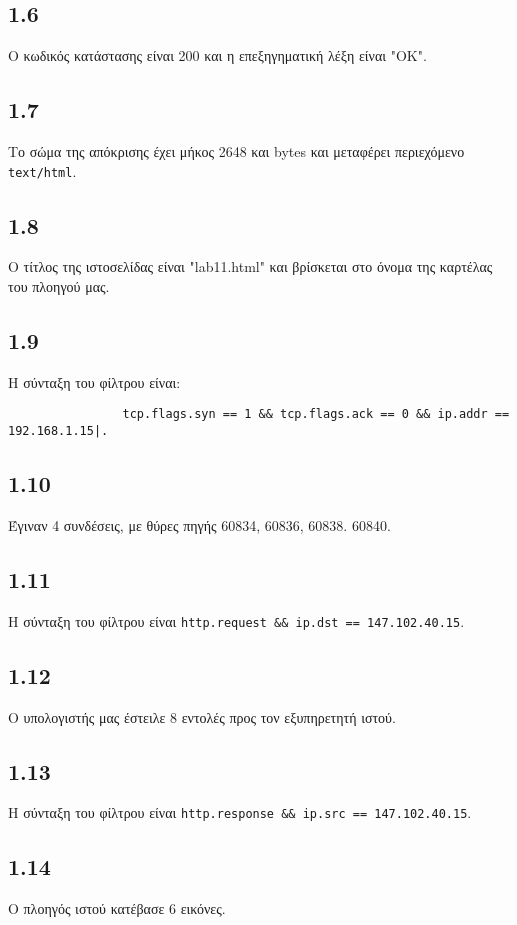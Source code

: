 		\subsection*{1.6}
			Ο κωδικός κατάστασης είναι 200 και η επεξηγηματική λέξη είναι "OK".

		\subsection*{1.7}
			Το σώμα της απόκρισης έχει μήκος 2648 και bytes και μεταφέρει περιεχόμενο \verb|text/html|.

		\subsection*{1.8}
			Ο τίτλος της ιστοσελίδας είναι "lab11.html" και βρίσκεται στο όνομα της καρτέλας του πλοηγού μας.

		\subsection*{1.9}
			Η σύνταξη του φίλτρου είναι:
			\begin{verbatim}
				tcp.flags.syn == 1 && tcp.flags.ack == 0 && ip.addr == 192.168.1.15|.
			\end{verbatim}

		\subsection*{1.10}
			Έγιναν 4 συνδέσεις, με θύρες πηγής 60834, 60836, 60838. 60840.

		\subsection*{1.11}
			Η σύνταξη του φίλτρου είναι \verb|http.request && ip.dst == 147.102.40.15|.

		\subsection*{1.12}
			Ο υπολογιστής μας έστειλε 8 εντολές προς τον εξυπηρετητή ιστού.

		\subsection*{1.13}
			Η σύνταξη του φίλτρου είναι \verb|http.response && ip.src == 147.102.40.15|.

		\subsection*{1.14}
			Ο πλοηγός ιστού κατέβασε 6 εικόνες.

